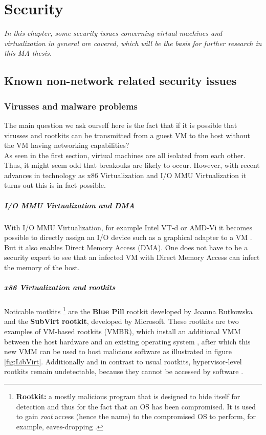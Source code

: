 \chapter{Security}
\label{chap:security}
\emph{In this chapter, some security issues concerning virtual machines and virtualization in general are covered, which will be the basis for further research in this MA thesis.}

\section{Known non-network related security issues}

\subsection{Virusses and malware problems}

The main question we ask ourself here is the fact that if it is possible that virusses and rootkits can be transmitted from a guest VM to the host without the VM having networking capabilities? \\

As seen in the first section, virtual machines are all isolated from each other. Thus, it might seem odd that breakouks are likely to occur. However, with recent advances in technology as x86 Virtualization and I/O MMU Virtualization it turns out this is in fact possible. \\

\paragraph{I/O MMU Virtualization and DMA} With I/O MMU Virtualization, for example Intel VT-d \citep{VTD} or AMD-Vi \citep{AMDVI} it becomes possible to directly assign an I/O device such as a graphical adapter to a VM \citep{HardwareVirt4}. But it also enables Direct Memory Access (DMA). One does not have to be a security expert to see that an infected VM with Direct Memory Access can infect the memory of the host.

\clearpage

\paragraph{x86 Virtualization and rootkits} Noticable rootkits \footnote{\textbf{Rootkit:} a mostly malicious program that is designed to hide itself for detection and thus for the fact that an OS has been compromised. It is used to gain \emph{root} access (hence the name) to the compromised OS to perform, for example, eaves-dropping \citep{VMBR, Rootkit}.} are the \textbf{Blue Pill} rootkit developed by Joanna Rutkowska and the \textbf{SubVirt rootkit}, developed by Microsoft. These rootkits are two examples of VM-based rootkits (VMBR), which install an additional VMM between the host hardware and an existing operating system \citep{BluePill,LibVirt}, after which this new VMM can be used to host malicious software as illustrated in figure \ref{fig:LibVirt}.  Additionally and in contrast to usual rootkits, hypervisor-level rootkits remain undetectable, because they cannot be accessed by software \citep{BluePill,VMBR}.

